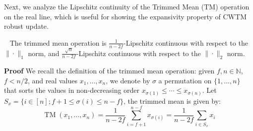 \documentclass[twoside,11pt]{article}
\newcommand\mb{\mathbb}
\begin{document}
Next, we analyze the Lipschitz continuity of the Trimmed Mean ($\mathrm{TM}$) operation on the real line, which is useful for showing the expansivity property of $\mathrm{CWTM}$ robust update.
\begin{lemma}~\label{tm-lipschitz}
    The trimmed mean operation is $\frac{1}{n-2f}$-Lipschitz continuous with respect to the $\|\cdot\|_1$ norm, 
    and $\frac{\sqrt{n}}{n-2f}$-Lipschitz continuous with respect to the $\|\cdot\|_2$ norm. 
\end{lemma}
\textbf{Proof}\;
We recall the definition of the trimmed mean operation: given $f, n \in \mb{N}$, $f < n/2$, and real values $x_1, \ldots, x_n$, 
    we denote by $\sigma$ a permutation on $\{1, \ldots, n\}$ that sorts the values in non-decreasing order 
    $x_{\sigma(1)} \leq \cdots \leq x_{\sigma(n)}$. Let $S_x=\{i \in [n]; f+1 \leq \sigma(i) \leq n-f\}$, 
    the trimmed mean is given by: 
    \[
    \operatorname{TM}(x_1, \ldots, x_n) 
    = \frac{1}{n-2f} \sum_{i=f+1}^{n-f} x_{\sigma(i)} 
    = \frac{1}{n-2f} \sum_{i \in S_x} x_i
    \]
\end{document}
